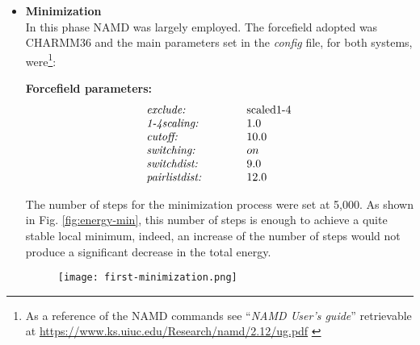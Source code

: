 \begin{itemize}
\item \textbf{Minimization}\\
In this phase NAMD was largely employed. The forcefield adopted was CHARMM36 and the main parameters set in the \textit{config} file, for both systems, were\footnote{As a reference of the NAMD commands see ``\textit{NAMD User's guide}'' retrievable at \url{https://www.ks.uiuc.edu/Research/namd/2.12/ug.pdf} \cite{ref:NAMD_ug}}:\\
\begin{center}
\textbf{Forcefield parameters:}
\vspace{-0.25cm}
\begin{equation*}
\begin{array}{ll}
\text{\textit{exclude:}} \qquad\quad & \text{scaled1-4}\\
\text{\textit{1-4scaling:}} \qquad\quad & 1.0\\
\text{\textit{cutoff:}} \qquad\quad & 10.0\\
\text{\textit{switching:}} \qquad\quad & on\\
\text{\textit{switchdist:}} \qquad\quad & 9.0\\
\text{\textit{pairlistdist:}} \qquad\quad & 12.0\\
\end{array}
\end{equation*}
\end{center}
The number of steps for the minimization process were set at 5,000. As shown in Fig. \ref{fig:energy-min}, this number of steps is enough to achieve a quite stable local minimum, indeed, an increase of the number of steps would not produce a significant decrease in the total energy.

\begin{figure}[H]
\centering
\begin{minipage}[t]{0.775\textwidth}
	\centering
    \texttt{[image: first-minimization.png]}
    

\end{minipage}
\end{figure}
\end{itemize}
